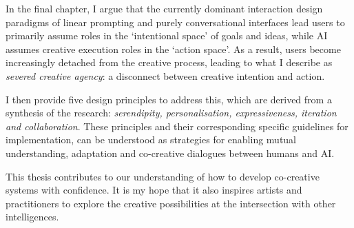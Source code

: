 In the final chapter, I argue that the currently dominant interaction design paradigms of linear prompting and purely conversational interfaces lead users to primarily assume roles in the `intentional space' of goals and ideas, while AI assumes creative execution roles in the `action space'. As a result, users become increasingly detached from the creative process, leading to what I describe as \textit{severed creative agency}: a disconnect between creative intention and action. 

I then provide five design principles to address this, which are derived from a synthesis of the research: \textit{serendipity, personalisation, expressiveness, iteration and collaboration}. These principles and their corresponding specific guidelines for implementation, can be understood as strategies for enabling mutual understanding, adaptation and co-creative dialogues between humans and AI. 

This thesis contributes to our understanding of how to develop co-creative systems with confidence. It is my hope that it also inspires artists and practitioners to explore the creative possibilities at the intersection with other intelligences.
